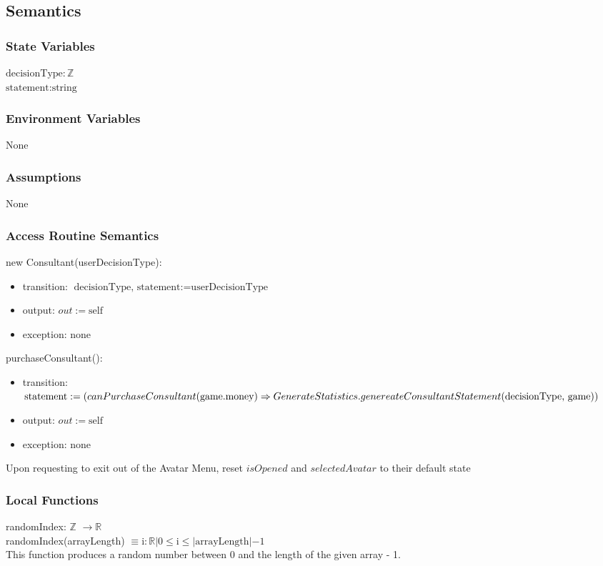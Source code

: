 \documentclass[12pt, titlepage]{article}
\begin{document}
\subsection{Semantics}

\subsubsection{State Variables}
$\text{decisionType}: \text{$\mathbb{Z}$}$\\
$\text{statement}: \text{string}$\\
\subsubsection{Environment Variables}
None

\subsubsection{Assumptions}
None

\subsubsection{Access Routine Semantics}

\noindent new Consultant(userDecisionType):
\begin{itemize}
\item transition: $\text{decisionType, statement}:= \text{userDecisionType}$
\item output: $out := \mbox{self}$
\item exception: none
\end{itemize}

\noindent purchaseConsultant():
\begin{itemize}
\item transition: $\text{statement}:= (canPurchaseConsultant(\text{game.money}) \Rightarrow \newline GenerateStatistics.genereateConsultantStatement(\text{decisionType, game}))$
\item output: $out := \mbox{self}$
\item exception: none
\end{itemize}


Upon requesting to exit out of the Avatar Menu, reset $isOpened$ and $selectedAvatar$ to their default state 

\subsubsection{Local Functions}
randomIndex: $\mathbb{Z}$ $\rightarrow \mathbb{R}$  \\
randomIndex(arrayLength) $\equiv \text{i} : \mathbb{R} | 0 \le \text{i} \le |\text{arrayLength}| - 1 $ \\
This function produces a random number between 0 and the length of the given array - 1. \\
\end{document}
